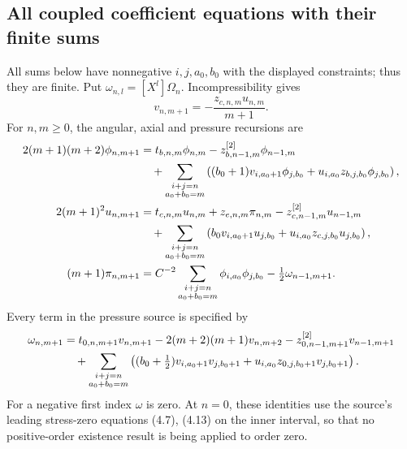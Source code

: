 \subsection{All coupled coefficient equations with their finite sums}

All sums below have nonnegative \(i,j,a_0,b_0\) with the displayed
constraints; thus they are finite. Put \(\omega_{n,l}=[X^l]\Omega_n\).
Incompressibility gives
\begin{equation}\label{nfr:V}
 v_{n,m+1}=-\frac{z_{c,n,m}u_{n,m}}{m+1}.
\end{equation}
For \(n,m\geq0\), the angular, axial and pressure recursions are
\begin{align}
 2(m+1)(m+2)\phi_{n,m+1}
 &=t_{b,n,m}\phi_{n,m}-z^{[2]}_{b,n-1,m}\phi_{n-1,m}\notag\\
 &\quad+\sum_{\substack{i+j=n\\a_0+b_0=m}}
 \left((b_0+1)v_{i,a_0+1}\phi_{j,b_0}
                +u_{i,a_0}z_{b,j,b_0}\phi_{j,b_0}\right),
 \label{nfr:phi}\\
 2(m+1)^2u_{n,m+1}
 &=t_{c,n,m}u_{n,m}+z_{e,n,m}\pi_{n,m}
                -z^{[2]}_{c,n-1,m}u_{n-1,m}\notag\\
 &\quad+\sum_{\substack{i+j=n\\a_0+b_0=m}}
 \left(b_0v_{i,a_0+1}u_{j,b_0}
                +u_{i,a_0}z_{c,j,b_0}u_{j,b_0}\right),
 \label{nfr:U}\\
 (m+1)\pi_{n,m+1}
 &=C^{-2}\sum_{\substack{i+j=n\\a_0+b_0=m}}
                       \phi_{i,a_0}\phi_{j,b_0}
                  -\tfrac12\omega_{n-1,m+1}.
 \label{nfr:pressure}
\end{align}
Every term in the pressure source is specified by
\begin{align}
 \omega_{n,m+1}
 &=t_{0,n,m+1}v_{n,m+1}
       -2(m+2)(m+1)v_{n,m+2}
       -z^{[2]}_{0,n-1,m+1}v_{n-1,m+1}\notag\\
 &\quad+\sum_{\substack{i+j=n\\a_0+b_0=m}}
 \left((b_0+\tfrac12)v_{i,a_0+1}v_{j,b_0+1}
                  +u_{i,a_0}z_{0,j,b_0+1}v_{j,b_0+1}\right).
 \label{nfr:Omega}
\end{align}
For a negative first index \(\omega\) is zero. At \(n=0\), these
identities use the source's leading stress-zero equations (4.7), (4.13)
on the inner interval, so that no positive-order existence result is
being applied to order zero.

